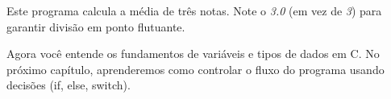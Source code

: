 Este programa calcula a média de três notas. Note o \textit{3.0} (em vez de \textit{3}) para garantir divisão em ponto flutuante.

Agora você entende os fundamentos de variáveis e tipos de dados em C. No próximo capítulo, aprenderemos como controlar o fluxo do programa usando decisões (if, else, switch).




